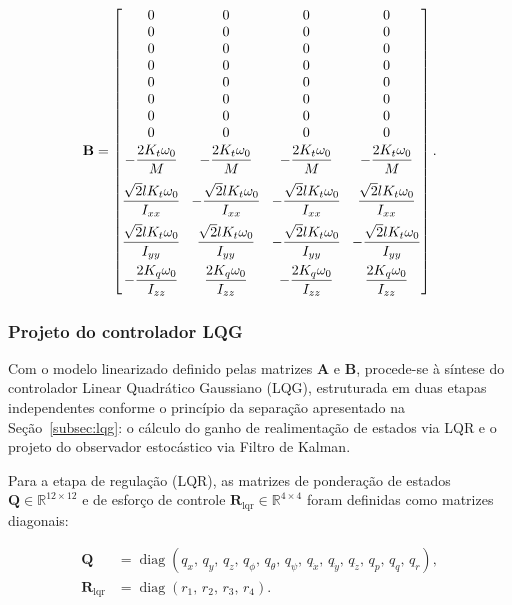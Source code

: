 \begin{equation}\label{eq:matriz_B_linear}
\setlength{\arraycolsep}{4pt}
\mathbf{B} = 
\begin{bmatrix}
0 & 0 & 0 & 0 \\
0 & 0 & 0 & 0 \\
0 & 0 & 0 & 0 \\
0 & 0 & 0 & 0 \\
0 & 0 & 0 & 0 \\
0 & 0 & 0 & 0 \\
0 & 0 & 0 & 0 \\
0 & 0 & 0 & 0 \\[2pt]
-\dfrac{2 K_t \omega_0}{M} & -\dfrac{2 K_t \omega_0}{M} & -\dfrac{2 K_t \omega_0}{M} & -\dfrac{2 K_t \omega_0}{M} \\[10pt]
\dfrac{\sqrt{2} l K_t \omega_0}{I_{xx}} & -\dfrac{\sqrt{2} l K_t \omega_0}{I_{xx}} & -\dfrac{\sqrt{2} l K_t \omega_0}{I_{xx}} & \dfrac{\sqrt{2} l K_t \omega_0}{I_{xx}} \\[10pt]
\dfrac{\sqrt{2} l K_t \omega_0}{I_{yy}} & \dfrac{\sqrt{2} l K_t \omega_0}{I_{yy}} & -\dfrac{\sqrt{2} l K_t \omega_0}{I_{yy}} & -\dfrac{\sqrt{2} l K_t \omega_0}{I_{yy}} \\[10pt]
-\dfrac{2 K_q \omega_0}{I_{zz}} & \dfrac{2 K_q \omega_0}{I_{zz}} & -\dfrac{2 K_q \omega_0}{I_{zz}} & \dfrac{2 K_q \omega_0}{I_{zz}}
\end{bmatrix}.
\end{equation}

\subsubsection{Projeto do controlador LQG}\label{subsubsec:projeto_controlador_lqg}

Com o modelo linearizado definido pelas matrizes $\mathbf{A}$ e $\mathbf{B}$, procede-se à síntese do controlador Linear Quadrático Gaussiano (LQG), estruturada em duas etapas independentes conforme o princípio da separação apresentado na Seção~\ref{subsec:lqg}: o cálculo do ganho de realimentação de estados via LQR e o projeto do observador estocástico via Filtro de Kalman.

Para a etapa de regulação (LQR), as matrizes de ponderação de estados $\mathbf{Q} \in \mathbb{R}^{12\times 12}$ e de esforço de controle $\mathbf{R}_{\mathrm{lqr}} \in \mathbb{R}^{4\times 4}$ foram definidas como matrizes diagonais:

\begin{equation}\label{eq:matrizes_Q_R_metodo}
\begin{aligned}
\mathbf{Q} &= \operatorname{diag}\left(q_x,\, q_y,\, q_z,\, q_\phi,\, q_\theta,\, q_\psi,\, q_{\dot{x}},\, q_{\dot{y}},\, q_{\dot{z}},\, q_p,\, q_q,\, q_r\right), \\
\mathbf{R}_{\mathrm{lqr}} &= \operatorname{diag}\left(r_1,\, r_2,\, r_3,\, r_4\right).
\end{aligned}
\end{equation}


